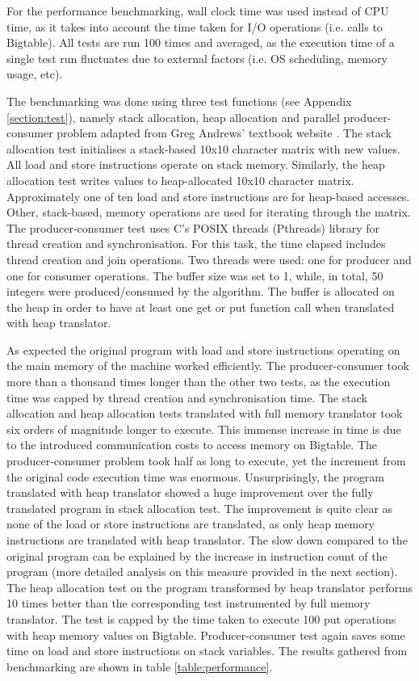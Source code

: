 \documentclass[bsc,frontabs,twoside,singlespacing,parskip,deptreport]{infthesis}     %
\begin{document}
For the performance benchmarking, wall clock time was used instead of CPU time, as it takes into account the time taken for I/O operations (i.e. calls to Bigtable). All tests are run 100 times and averaged, as the execution time of a single test run fluctuates due to external factors (i.e. OS scheduling, memory usage, etc).

The benchmarking was done using three test functions (see Appendix \ref{section:test}), namely stack allocation, heap allocation and parallel producer-consumer problem adapted from Greg Andrews' textbook website \citep{producer-consumer}. The stack allocation test initialises a stack-based 10x10 character matrix with new values. All load and store instructions operate on stack memory. Similarly, the heap allocation test writes values to heap-allocated 10x10 character matrix. Approximately one of ten load and store instructions are for heap-based accesses. Other, stack-based, memory operations are used for iterating through the matrix. The producer-consumer test uses C's POSIX threads (Pthreads) library for thread creation and synchronisation. For this task, the time elapsed includes thread creation and join operations. Two threads were used: one for producer and one for consumer operations. The buffer size was set to 1, while, in total, 50 integers were produced/consumed by the algorithm. The buffer is allocated on the heap in order to have at least one get or put function call when translated with heap translator.

As expected the original program with load and store instructions operating on the main memory of the machine worked efficiently. The producer-consumer took more than a thousand times longer than the other two tests, as the execution time was capped by thread creation and synchronisation time. The stack allocation and heap allocation tests translated with full memory translator took six orders of magnitude longer to execute. This immense increase in time is due to the introduced communication costs to access memory on Bigtable. The producer-consumer problem took half as long to execute, yet the increment from the original code execution time was enormous. Unsurprisingly, the program translated with heap translator showed a huge improvement over the fully translated program in stack allocation test. The improvement is quite clear as none of the load or store instructions are translated, as only heap memory instructions are translated with heap translator. The slow down compared to the original program can be explained by the increase in instruction count of the program (more detailed analysis on this measure provided in the next section). The heap allocation test on the program transformed by heap translator performs 10 times better than the corresponding test instrumented by full memory translator. The test is capped by the time taken to execute 100 put operations with heap memory values on Bigtable. Producer-consumer test again saves some time on load and store instructions on stack variables. The results gathered from benchmarking are shown in table \ref{table:performance}.
\end{document}
